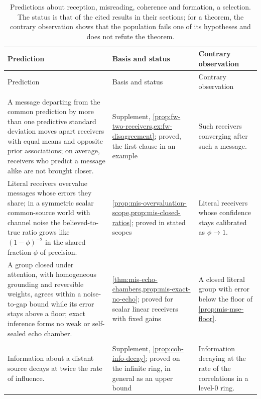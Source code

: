 \begingroup
\footnotesize
\setlength{\tabcolsep}{4pt}
\begin{longtable}{@{}>{\raggedright\arraybackslash}p{6.5cm}>{\raggedright\arraybackslash}p{3.9cm}>{\raggedright\arraybackslash}p{5.1cm}@{}}
\caption{Predictions about reception, misreading, coherence and formation, a selection. The status is that of the cited results in their sections; for a theorem, the contrary observation shows that the population fails one of its hypotheses and does not refute the theorem.}\label{tab:pre-reception}\\
\toprule
Prediction & Basis and status & Contrary observation\\
\midrule
\endfirsthead
\toprule
Prediction & Basis and status & Contrary observation\\
\midrule
\endhead
\bottomrule
\endfoot
\multicolumn{3}{@{}l}{\textit{Reception and misreading, \cref{hyp:int-h2}}}\\
A message departing from the common prediction by more than one predictive standard deviation moves apart receivers with equal means and opposite prior associations; on average, receivers who predict a message alike are not brought closer. & Supplement, \cref{prop:fw-two-receivers,ex:fw-disagreement}; proved, the first clause in an example & Such receivers converging after such a message.\\
\addlinespace
Literal receivers overvalue messages whose errors they share; in a symmetric scalar common-source world with channel noise the believed-to-true ratio grows like $(1-\phi)^{-2}$ in the shared fraction $\phi$ of precision. & \cref{prop:mis-overvaluation-scope,prop:mis-closed-ratios}; proved in stated scopes & Literal receivers whose confidence stays calibrated as $\phi\to1$.\\
\addlinespace
A group closed under attention, with homogeneous grounding and reversible weights, agrees within a noise-to-gap bound while its error stays above a floor; exact inference forms no weak or self-sealed echo chamber. & \cref{thm:mis-echo-chambers,prop:mis-exact-no-echo}; proved for scalar linear receivers with fixed gains & A closed literal group with error below the floor of \cref{prop:mis-mse-floor}.\\
\midrule
\multicolumn{3}{@{}l}{\textit{Coherence and formation, \cref{hyp:int-h3}}}\\
Information about a distant source decays at twice the rate of influence. & Supplement, \cref{prop:coh-info-decay}; proved on the infinite ring, in general as an upper bound & Information decaying at the rate of the correlations in a level-0 ring.\\

\end{longtable}

